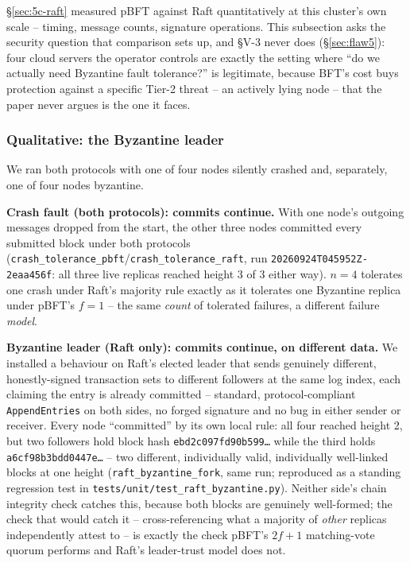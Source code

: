 \documentclass[conference]{IEEEtran}
\begin{document}
\S\ref{sec:5c-raft} measured pBFT against Raft quantitatively at this cluster's own scale --
timing, message counts, signature operations. This subsection asks the security question that
comparison sets up, and \S V-3 never does (\S\ref{sec:flaw5}): four cloud servers the operator
controls are exactly the setting where ``do we actually need Byzantine fault tolerance?'' is
legitimate, because BFT's cost buys protection against a specific Tier-2 threat -- an actively
lying node -- that the paper never argues is the one it faces.
\subsubsection{Qualitative: the Byzantine leader}
\label{sec:m7-4-byzantine}

We ran both protocols with one of four nodes silently crashed and, separately, one of four nodes
byzantine.

\textbf{Crash fault (both protocols): commits continue.} With one node's outgoing messages
dropped from the start, the other three nodes committed every submitted block under both
protocols (\texttt{crash\_tolerance\_pbft}/\texttt{crash\_tolerance\_raft}, run
\texttt{20260924T045952Z-2eaa456f}: all three live replicas reached height 3 of 3 either way).
$n=4$ tolerates one crash under Raft's majority rule exactly as it tolerates one Byzantine replica
under pBFT's $f=1$ -- the same \emph{count} of tolerated failures, a different failure
\emph{model}.

\textbf{Byzantine leader (Raft only): commits continue, on different data.} We installed a
behaviour on Raft's elected leader that sends genuinely different, honestly-signed transaction
sets to different followers at the same log index, each claiming the entry is already committed
-- standard, protocol-compliant \texttt{AppendEntries} on both sides, no forged signature and no
bug in either sender or receiver. Every node ``committed'' by its own local rule: all four reached
height 2, but two followers hold block hash
\texttt{ebd2c097fd90b599\ldots} while the third holds \texttt{a6cf98b3bdd0447e\ldots} -- two
different, individually valid, individually well-linked blocks at one height
(\texttt{raft\_byzantine\_fork}, same run; reproduced as a standing regression test in
\texttt{tests/unit/test\_raft\_byzantine.py}). Neither side's chain integrity check catches this,
because both blocks are genuinely well-formed; the check that would catch it -- cross-referencing
what a majority of \emph{other} replicas independently attest to -- is exactly the check pBFT's
$2f+1$ matching-vote quorum performs and Raft's leader-trust model does not.
\end{document}
